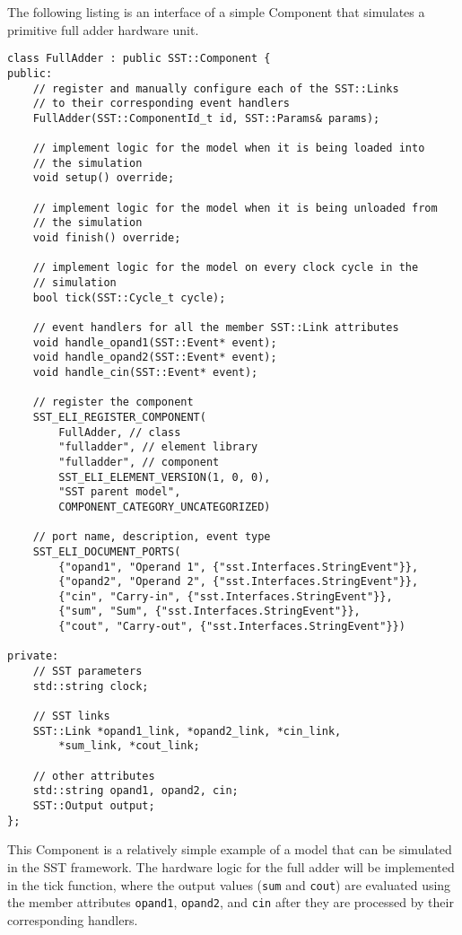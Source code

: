 The following listing is an interface of a simple Component that simulates a primitive full adder hardware unit.
\newpage
\begin{lstlisting}[style=customC++,label=currentModel,caption=Example Interface of an SST Component Model]
class FullAdder : public SST::Component {
public:
    // register and manually configure each of the SST::Links
    // to their corresponding event handlers
    FullAdder(SST::ComponentId_t id, SST::Params& params);

    // implement logic for the model when it is being loaded into
    // the simulation
    void setup() override;

    // implement logic for the model when it is being unloaded from
    // the simulation
    void finish() override;

    // implement logic for the model on every clock cycle in the
    // simulation
    bool tick(SST::Cycle_t cycle);

    // event handlers for all the member SST::Link attributes
    void handle_opand1(SST::Event* event);
    void handle_opand2(SST::Event* event);
    void handle_cin(SST::Event* event);

    // register the component
    SST_ELI_REGISTER_COMPONENT(
        FullAdder, // class
        "fulladder", // element library
        "fulladder", // component
        SST_ELI_ELEMENT_VERSION(1, 0, 0),
        "SST parent model",
        COMPONENT_CATEGORY_UNCATEGORIZED)

    // port name, description, event type
    SST_ELI_DOCUMENT_PORTS(
        {"opand1", "Operand 1", {"sst.Interfaces.StringEvent"}},
        {"opand2", "Operand 2", {"sst.Interfaces.StringEvent"}},
        {"cin", "Carry-in", {"sst.Interfaces.StringEvent"}},
        {"sum", "Sum", {"sst.Interfaces.StringEvent"}},
        {"cout", "Carry-out", {"sst.Interfaces.StringEvent"}})

private:
    // SST parameters
    std::string clock;

    // SST links
    SST::Link *opand1_link, *opand2_link, *cin_link, 
        *sum_link, *cout_link;

    // other attributes
    std::string opand1, opand2, cin;
    SST::Output output;
};
\end{lstlisting}
\newpage

This Component is a relatively simple example of a model that can be simulated in the SST framework. The hardware logic for the full adder will be implemented in the tick function, where the output values (\texttt{sum} and \texttt{cout}) are evaluated using the member attributes \texttt{opand1}, \texttt{opand2}, and \texttt{cin} after they are processed by their corresponding handlers.


